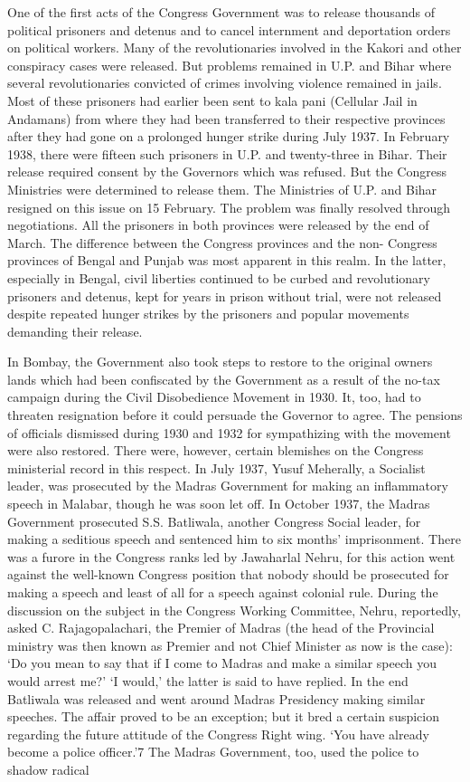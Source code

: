 \begin{multicols}{2}
One of the first acts of the Congress Government was to release thousands of political prisoners and detenus and to cancel internment and deportation orders on political workers. Many of the revolutionaries involved in the Kakori and other conspiracy cases were released. But problems remained in U.P. and Bihar where several revolutionaries convicted of crimes involving violence remained in jails. Most of these prisoners had earlier been sent to kala pani (Cellular Jail in Andamans) from where they had been transferred to their respective provinces after they had gone on a prolonged hunger strike during July 1937. In February 1938, there were fifteen such prisoners in U.P. and twenty-three in Bihar. Their release required consent by the Governors which was refused. But the Congress Ministries were determined to release them. The Ministries of U.P. and Bihar resigned on this issue on 15 February. The problem was finally resolved through negotiations. All the prisoners in both provinces were released by the end of March. The difference between the Congress provinces and the non- Congress provinces of Bengal and Punjab was most apparent in this realm. In the latter, especially in Bengal, civil liberties continued to be curbed and revolutionary prisoners and detenus, kept for years in prison without trial, were not released despite repeated hunger strikes by the prisoners and popular movements demanding their release. 

In Bombay, the Government also took steps to restore to the original owners lands which had been confiscated by the Government as a result of the no-tax campaign during the Civil Disobedience Movement in 1930. It, too, had to threaten resignation before it could persuade the Governor to agree. The pensions of officials dismissed during 1930 and 1932 for sympathizing with the movement were also restored. There were, however, certain blemishes on the Congress ministerial record in this respect. In July 1937, Yusuf Meherally, a Socialist leader, was prosecuted by the Madras Government for making an inflammatory speech in Malabar, though he was soon let off. In October 1937, the Madras Government prosecuted S.S. Batliwala, another Congress Social leader, for making a seditious speech and sentenced him to six months' imprisonment. There was a furore in the Congress ranks led by Jawaharlal Nehru, for this action went against the well-known Congress position that nobody should be prosecuted for making a speech and least of all for a speech against colonial rule. During the discussion on the subject in the Congress Working Committee, Nehru, reportedly, asked C. Rajagopalachari, the Premier of Madras (the head of the Provincial ministry was then known as Premier and not Chief Minister as now is the case): `Do you mean to say that if I come to Madras and make a similar speech you would arrest me?' `I would,' the latter is said to have replied. In the end Batliwala was released and went around Madras Presidency making similar speeches. The affair proved to be an exception; but it bred a certain suspicion regarding the future attitude of the Congress Right wing. `You have already become a police officer.'7 The Madras Government, too, used the police to shadow radical 


\end{multicols}

